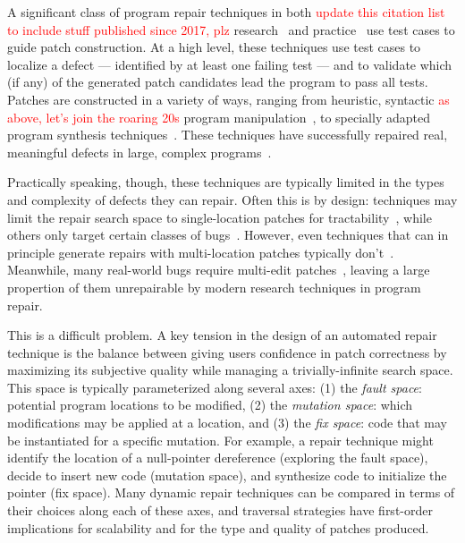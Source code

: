 \documentclass[10pt, conference]{IEEEtran}
\newcommand\todo[1]{\textcolor{red}{#1}}
\begin{document}
A significant class of program repair techniques in both
\todo{update this citation list to include stuff published since 2017, plz}
research~\cite{genprog,angelix,Le17, Xuan17} and practice~\cite{sapfix} use test
cases to guide patch construction. At a high level, these techniques use test cases
to localize a defect --- identified by at least one failing test --- and to
validate which (if any) of the generated patch candidates lead
the program to pass all tests.
%
Patches are constructed in a variety of ways, ranging from heuristic, syntactic
\todo{as above, let's join the roaring 20s}
program manipulation~\cite{par,genprog,rsrepair,ae,prophet,hdrepair}, to specially adapted program
synthesis techniques~\cite{Konighofer11,Konighofer12,semfix,DeMarco14,angelix}. These techniques have successfully
repaired real, meaningful defects in large, complex
programs~\cite{angelix,genprog-eight-dollars,prophet,sapfix}.

Practically speaking, though, these techniques are typically limited in the types and
complexity of defects they can repair. Often this is by design: techniques may
limit the repair search space to single-location patches for
tractability~\cite{rsrepair,ae,hdrepair}, while others only target certain
classes of bugs~\cite{Xuan17,sapfix,DeMarco14,par}. However, even techniques
that can in principle generate repairs with multi-location patches typically
don't~\cite{patch-correctness}.
%
Meanwhile, many real-world bugs require multi-edit patches~\cite{d4j-dissection,zhong2015}, leaving a large
propertion of them  unrepairable by modern
research techniques in program repair.  

This is a difficult problem.
A key tension in the design of an automated repair technique is the balance
between giving users confidence in patch correctness by maximizing its
subjective quality while managing a trivially-infinite search space. This space
is typically parameterized along several axes: (1) the \emph{fault space}:
potential program locations to be modified, (2) the \emph{mutation space}: which
modifications may be applied at a location, and (3) the \emph{fix space}: code
that may be instantiated for a specific mutation. For example, a repair
technique might identify the location of a null-pointer dereference (exploring
the fault space), decide to insert new code (mutation space), and synthesize
code to initialize the pointer (fix space). Many dynamic repair techniques can
be compared in terms of their choices along each of these axes, and traversal
strategies have first-order implications for scalability and for the type and
quality of patches produced.
\end{document}
